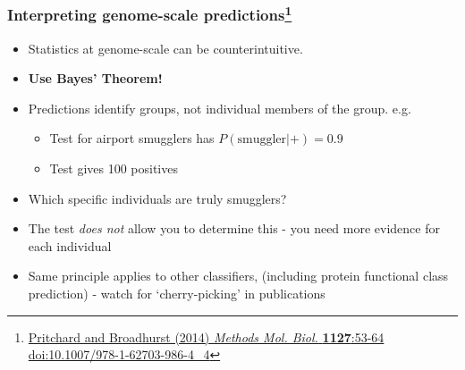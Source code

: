 \begin{frame}
  \frametitle{Interpreting genome-scale predictions\footnote{\tiny{\href{http://dx.doi.org/10.1007/978-1-62703-986-4_4}{Pritchard and Broadhurst (2014) \textit{Methods Mol. Biol.} \textbf{1127}:53-64 doi:10.1007/978-1-62703-986-4\_4}}}}
  \begin{itemize}
    \item<1-> Statistics at genome-scale can be counterintuitive.
    \item<1-> \textbf{Use Bayes' Theorem!}
    \item<1-> Predictions identify groups, not individual members of the group. e.g.
    \begin{itemize}
      \item Test for airport smugglers has $P(\text{smuggler}|+) = 0.9$
      \item Test gives 100 positives
    \end{itemize}
    \item<1-> Which specific individuals are truly smugglers?
    \item<2-> The test \emph{does not} allow you to determine this - you need more evidence for each individual
    \item<2->  Same principle applies to other classifiers, (including protein functional class prediction) - watch for `cherry-picking' in publications
  \end{itemize} 
\end{frame}